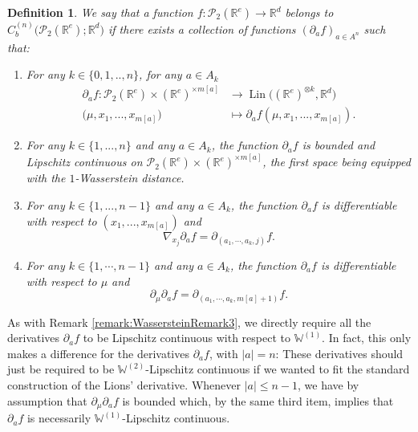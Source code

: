 \documentclass[a4paper,11pt,twoside]{article}
\numberwithin{equation}{section}
\theoremstyle{plain}
\newtheorem{definition}[theorem]{Definition}
\newcommand{\bR}{\mathbb{R}}
\newcommand{\bW}{\mathbb{W}}
\newcommand{\cP}{\mathcal{P}}
\DeclareMathOperator{\lin}{Lin}
\newcommand{\1}{\mathbbm{1}}
\begin{document}
	\begin{definition}
		\label{def:general:Lions:derivative}
		We say that a function $f:\cP_2(\bR^e) \to \bR^d$ belongs to $C_b^{(n)}\big( \cP_2(\bR^e); \bR^d \big)$ if there exists a collection of functions $(\partial_{a} f)_{a \in A^{n}}$ such that:
		
		\begin{enumerate}
			\item For any $k \in \{0, 1,.., n\}$, for any $a \in A_{k}$
			\begin{equation}
				\label{eq:def:general:Lions:derivative}
				\begin{split}
					\partial_{a} f : \cP_{2}( \bR^e) \times ( \bR^e)^{\times m[a]} &\rightarrow
					\lin\Big( (\bR^e)^{\otimes k}, \bR^d \Big)
					\\
					\big( \mu, x_{1},...,x_{m[a]} \big) &\mapsto \partial_{a} f(\mu,x_{1}, ..., x_{m[a]}).
				\end{split}
			\end{equation}
			
			\item For any $k \in \{1,...,n\}$ and any $a \in A_{k}$,  the function 
			$\partial_{a} f$ is bounded and Lipschitz continuous on $\cP_{2}( \bR^e) \times (\bR^e)^{\times m[a]}$, the first space being equipped with the $1$-Wasserstein distance.
			
			\item For any $k \in \{1,...,n-1\}$ and any $a \in A_{k}$, the function 
			$\partial_{a} f$ is differentiable with respect to $(x_{1},...,x_{m[a]})$ and 
			$$
			\nabla_{x_{j}} \partial_{a} f = \partial_{(a_{1},\cdots,a_{k},j)} f.
			$$
			
			\item For any $k \in \{1,\cdots,n-1\}$ and any $a \in A_{k}$, the function 
			$\partial_{a} f$ is differentiable with respect to $\mu$ and
			$$
			\partial_{\mu} \partial_{a} f = \partial_{(a_{1},\cdots,a_{k},m[a] + 1)} f.
			$$
		\end{enumerate}
	\end{definition}
	
	As with Remark \ref{remark:WassersteinRemark3}, we directly require all the derivatives $\partial_{a} f$ to be Lipschitz continuous with respect to $\bW^{(1)}$. In fact, this only makes a difference for the derivatives $\partial_{a} f$, with $|a|=n$: These derivatives should just be required to be $\bW^{(2)}$-Lipschitz continuous if we wanted to fit the standard construction of the Lions' derivative. Whenever $|a| \leq n-1$, we have by assumption that $\partial_{\mu} \partial_{a} f$ is bounded which, by the same third item, implies that $\partial_{a} f$ is necessarily $\bW^{(1)}$-Lipschitz continuous.
	
\end{document}
